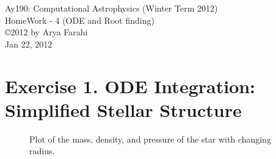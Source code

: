 \documentclass[10pt]{article}
\begin{document}
\begin{center}
{\large Ay190: Computational Astrophysics (Winter Term 2012)} \\
{\large HomeWork - 4 (ODE and Root finding) } \\
\copyright 2012 by Arya Farahi \\
Jan 22, 2012
\end{center}

\section{Exercise 1. ODE Integration: Simplified Stellar Structure}

\begin{figure}[hbt]
  \centering
    \caption{ Plot of the mass, density, and pressure of the star with changing radius.}
\end{figure}
\end{document}
